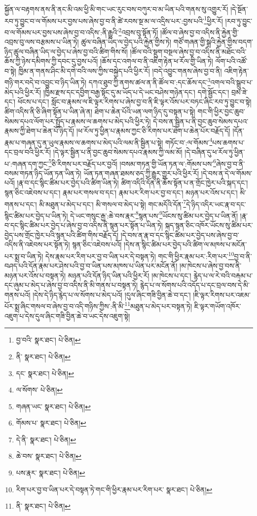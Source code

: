 སྐྱོན་ལ་བརྟགས་ནས་ནི་ནང་མི་འམ་ཕྱི་མི་གང་ཡང་རུང་བས་བཀུར་བ་མ་ཡིན་པའི་གནས་སུ་འགྱུར་རོ། །དེ་སྔོན་རབ་ཏུ་བྱུང་བ་ལ་གོམས་པར་བྱས་པས་ཞེས་བྱ་བ་ནི་ཚེ་རབས་སྔ་མ་ལ་འདྲིས་པར་:བྱས་པའི་\footnote{བྱ་བའི་  སྣར་ཐང་།  པེ་ཅིན། }ཕྱིར་རོ། །རབ་ཏུ་བྱུང་བ་ལ་གོམས་པར་བྱས་པས་ཞེས་བྱ་བ་འདིས་:ནི་རྒྱུའི་\footnote{ནི་  སྣར་ཐང་།  པེ་ཅིན། }འབྲས་བུ་སྟོན་ཏོ། །ཚོལ་བ་ཞེས་བྱ་བ་འདིས་ནི་རྐྱེན་གྱི་འབྲས་བུ་ལས་བརྩམས་པ་ཡིན་ཏེ། ཚུལ་བཞིན་ཡིད་ལ་བྱེད་པའི་རྐྱེན་གྱིས་ཏེ། གཙོ་གཞན་གྱི་སྒྲའི་རྐྱེན་གྱིས་བདག་ཉིད་ཚུལ་བཞིན་ཡིད་ལ་བྱེད་པ་ཞེས་བྱ་བའི་ཚིག་གིས་སོ། །ཚོལ་བའི་སྡུག་བསྔལ་ཞེས་བྱ་བ་འདིས་ནི་མཐོང་བའི་ཆོས་ཀྱི་ཉེས་དམིགས་ཀྱི་དབང་དུ་བྱས་པའོ། །ཆོས་དང་འགལ་བ་ནི་འཇིག་རྟེན་ཕ་རོལ་གྱི་ཡིན་ཏེ། ལོག་པའི་འཚོ་བ་སྟེ། ཁྱིམ་ན་གནས་ཤིང་མི་དགེ་བའི་ལས་ཀྱིས་བསྐྱེད་པའི་ཕྱིར་རོ། །བདེ་འབྱུང་གནས་ཞེས་བྱ་བ་ནི། འཇིག་རྟེན་གཉི་གར་བདེ་བ་འབྱུང་བ་ཉིད་ཡིན་ཏེ། དཀའ་ཐུབ་ཀྱི་ནགས་ཚལ་ན་ནི་ཚོལ་བ་:དང་ཆོས་དང་\footnote{དང་  སྣར་ཐང་།  པེ་ཅིན། }འགལ་བའི་སྒྲུབ་པ་མེད་པའི་ཕྱིར་རོ། །ཁྱིམ་རྫས་དང་དབྱིག་བརྒྱ་སྟོང་དུ་མ་ཡོད་པ་དེ་ཡང་བཤེས་གཉེན་དང་། དགེ་སྦྱོང་དང་། བྲམ་ཟེ་དང་། ཕོངས་པ་དང་། སློང་བ་རྣམས་ལ་ཇི་ལྟར་རིགས་པ་ཞེས་བྱ་བ་ནི་ཇི་ལྟར་འོས་པར་བཏང་ཞིང་རབ་ཏུ་བྱུང་བ་སྟེ། ཚིག་འདིས་ནི་ཅི་ཞིག་སྟོན་པ་ཡིན་ཞེ་ན། ཐེག་པ་ཆེན་པོའི་ཡན་ལག་ཉིད་དུ་བསྟན་པ་སྟེ། གང་གི་ཕྱིར་བྱང་ཆུབ་སེམས་དཔའ་ལོག་པར་སྤྱོད་པ་རྣམས་ལ་ཆགས་པ་མེད་པའི་ཕྱིར་ཏེ། དེ་བས་ན་སྦྱིན་པ་ནི་བྱང་ཆུབ་སེམས་དཔའ་རྣམས་ཀྱི་ཐེག་པ་ཆེན་པོ་ཉིད་དོ། །ཕ་རོལ་ཏུ་ཕྱིན་པ་རྣམས་ཀྱང་ཅི་རིགས་པར་ཐེག་པ་ཆེན་པོར་བརྗོད་དོ། །དོན་རྣམ་པ་གཞན་དུ་ན་ཡུལ་རྣམས་ལ་ཆགས་པ་མེད་པའི་ལམ་ནི་སྦྱིན་པ་སྟེ། གཏོང་བ་:ལ་གོམས་\footnote{ལ་སོགས་  པེ་ཅིན། }པས་ཆགས་པ་དང་བྲལ་བའི་ཕྱིར་རོ། །དེ་ལྟར་སྦྱིན་པ་ནི་བྱང་ཆུབ་སེམས་དཔའ་རྣམས་ཀྱི་ལམ་མོ། །དེ་བཞིན་དུ་ཕ་རོལ་ཏུ་ཕྱིན་པ་:གཞན་དག་ཀྱང་\footnote{གཞན་ཡང་  སྣར་ཐང་།  པེ་ཅིན། }ཅི་རིགས་པར་བརྗོད་པར་བྱའོ། །བསམ་གཏན་གྱི་ཡོན་ཏན་ལ་:གོམས་པས་\footnote{གོམས་པ་  སྣར་ཐང་།  པེ་ཅིན། }ཞེས་བྱ་བ་ནི་བསམ་གཏན་ཉིད་ཡོན་ཏན་ཡིན་ཏེ། ཡོན་ཏན་གཞན་ཐམས་ཅད་ཀྱི་རྒྱུར་གྱུར་པའི་ཕྱིར་རོ། །དེ་བས་ན་དེ་ལ་གོམས་པའོ། །རྣ་བ་དང་སྙིང་ཚིམ་པར་བྱེད་པའི་ཚིག་ཡིན་ཏེ། ཚིག་འདིའི་དོན་ནི་ཆོས་སྟོན་པ་ན་གྲོང་ཁྱེར་པའི་སྐད་དང་། སྙན་ཅིང་འཇེབས་པ་དང་། རྣམ་པར་གསལ་བ་དང་། རྣམ་པར་རིག་པར་བྱ་བ་དང་། མཉན་པར་འོས་པ་དང་། མི་གནས་པ་དང་། མི་མཐུན་པ་མེད་པ་དང་། མི་གསལ་བ་མེད་པ་སྟེ། གང་མདོའི་དོན་\footnote{དེ་ནི་  སྣར་ཐང་།  པེ་ཅིན། }དེ་ཉིད་འདིར་ཡང་རྣ་བ་དང་སྙིང་ཚིམ་པར་བྱེད་པ་ཡིན་ཏེ། དེ་ཡང་གསུང་རྒྱ་:ཆེ་བས་རྣར་\footnote{ཆེ་བས་  སྣར་ཐང་།  པེ་ཅིན། }སྙན་པས་\footnote{པས་རྣར་  སྣར་ཐང་།  པེ་ཅིན། }ཡོངས་སུ་ཚིམ་པར་བྱེད་པ་ཡིན་ནོ། །རྣ་བ་དང་སྙིང་ཚིམ་པར་བྱེད་པ་ཞེས་བྱ་བ་འདིས་ནི་སྙན་པར་སྟོན་པ་ཡིན་ཏེ། སྐད་སྙན་ཅིང་འཁོར་ཡོངས་སུ་ཚིམ་པར་བྱེད་པས་གྲོང་ཁྱེར་པའི་སྙན་པའི་ཚིག་གིས་བརྗོད་དོ། །དེ་བས་ན་རྣ་བ་དང་སྙིང་ཚིམ་པར་བྱེད་པས་ཞེས་བྱ་བ་འདིས་ནི་འཇེབས་པར་སྟོན་ཏེ། སྙན་ཅིང་འཇེབས་པའོ། །དེས་ན་སྙིང་ཚིམ་པར་བྱེད་པའི་ཚིག་ལ་མཁས་པ་མངོན་པར་སྨྲ་བ་ཡིན་ཏེ། དེས་རྣམ་པར་རིག་པར་བྱ་བ་ཡིན་པར་དེ་བསྟན་ཏེ། གང་གི་ཕྱིར་རྣམ་པར་:རིག་པར་\footnote{རིག་པར་བྱ་བ་ཡིན་པར་དེ་བསྟན་ཏེ་གང་གི་ཕྱིར་རྣམ་པར་རིག་པར་  སྣར་ཐང་།  པེ་ཅིན། }བྱ་བ་ནི་བཤད་པའི་དོན་རྣམ་པར་ཤེས་པའི་བྱ་བ་ཡིན་པས་མཁས་པ་ཡིན་པར་མངོན་ནོ། །མ་ཁེངས་པ་ཞེས་བྱ་བས་ནི་མཉན་པར་འོས་པ་བསྟན་ཏེ། མཉན་པའི་དོན་ཉིད་ཡིན་པའི་ཕྱིར་རོ། །མ་ཁེངས་པ་དང་། རྙེད་པ་ལ་རེ་བའི་བརྐམ་པ་དང་ཞུམ་པ་མེད་པ་ཞེས་བྱ་བ་འདིས་ནི་མི་གནས་པ་བསྟན་ཏེ། རྙེད་པ་ལ་སོགས་པའི་འདོད་པ་དང་བྲལ་བས་དེ་མི་གནས་པའོ། །དེས་དེ་ཉིད་རྙེད་པ་ལ་སོགས་པ་མེད་པའོ། །དུལ་ཞིང་གཟི་བྱིན་ཆེ་བ་དང་། །ཇི་ལྟར་རིགས་པར་འཇམ་པོར་སྨྲ་ཞིང་གསལ་བ་ཞེས་བྱ་བ་འདི་གཉིས་ཀྱིས་:ནི་མི་\footnote{ནི་  སྣར་ཐང་།  པེ་ཅིན། }མཐུན་པ་མེད་པར་བསྟན་ཏེ། ཇི་ལྟར་གཡོག་འཁོར་འཇུག་པ་དེས་དུལ་ཞིང་གཟི་བྱིན་ཆེ་བ་ཡང་དེས་འཇུག་སྟེ། 